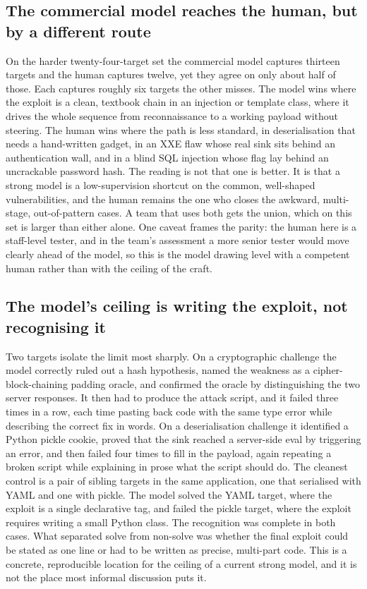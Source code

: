 \documentclass[11pt]{article}
\begin{document}
\subsection{The commercial model reaches the human, but by a different route}
On the harder twenty-four-target set the commercial model captures thirteen targets and the human captures twelve, yet they agree on only about half of those. Each captures roughly six targets the other misses. The model wins where the exploit is a clean, textbook chain in an injection or template class, where it drives the whole sequence from reconnaissance to a working payload without steering. The human wins where the path is less standard, in deserialisation that needs a hand-written gadget, in an XXE flaw whose real sink sits behind an authentication wall, and in a blind SQL injection whose flag lay behind an uncrackable password hash. The reading is not that one is better. It is that a strong model is a low-supervision shortcut on the common, well-shaped vulnerabilities, and the human remains the one who closes the awkward, multi-stage, out-of-pattern cases. A team that uses both gets the union, which on this set is larger than either alone. One caveat frames the parity: the human here is a staff-level tester, and in the team's assessment a more senior tester would move clearly ahead of the model, so this is the model drawing level with a competent human rather than with the ceiling of the craft.

\subsection{The model's ceiling is writing the exploit, not recognising it}
Two targets isolate the limit most sharply. On a cryptographic challenge the model correctly ruled out a hash hypothesis, named the weakness as a cipher-block-chaining padding oracle, and confirmed the oracle by distinguishing the two server responses. It then had to produce the attack script, and it failed three times in a row, each time pasting back code with the same type error while describing the correct fix in words. On a deserialisation challenge it identified a Python pickle cookie, proved that the sink reached a server-side eval by triggering an error, and then failed four times to fill in the payload, again repeating a broken script while explaining in prose what the script should do. The cleanest control is a pair of sibling targets in the same application, one that serialised with YAML and one with pickle. The model solved the YAML target, where the exploit is a single declarative tag, and failed the pickle target, where the exploit requires writing a small Python class. The recognition was complete in both cases. What separated solve from non-solve was whether the final exploit could be stated as one line or had to be written as precise, multi-part code. This is a concrete, reproducible location for the ceiling of a current strong model, and it is not the place most informal discussion puts it.
\end{document}
